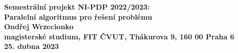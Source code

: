 \documentclass[epsf,epic,eepic,eepicemu]{article}
\begin{document}
\begin{center}
\bf Semestrální projekt NI-PDP 2022/2023:\\[5mm]
    Paralelní algoritmus pro řešení problému\\[5mm] 
    Ondřej Wrzecionko\\[2mm]
magisterské studium, FIT ČVUT, Thákurova 9, 160 00 Praha 6\\[2mm]
25. dubna 2023
\end{center}






\end{document}
